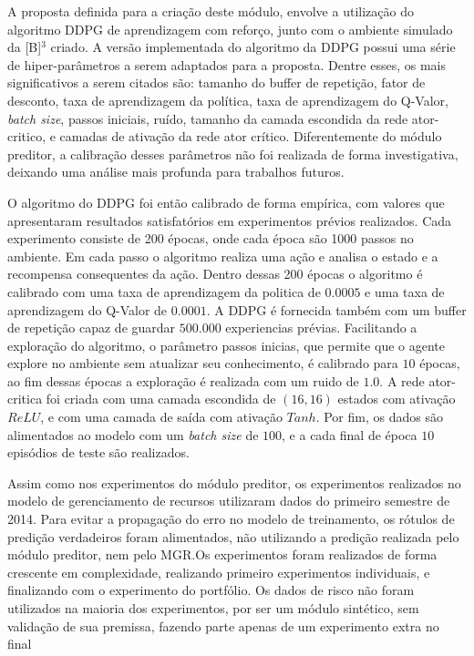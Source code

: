 A proposta definida para a criação deste módulo, envolve a utilização do algoritmo \acrshort{DDPG} de aprendizagem com reforço, junto com o ambiente simulado da [B]$^3$ criado. A versão implementada do algoritmo da \acrshort{DDPG} possui uma série de hiper-parâmetros a serem adaptados para a proposta. Dentre esses, os mais significativos a serem citados são: tamanho do buffer de repetição, fator de desconto, taxa de aprendizagem da política, taxa de aprendizagem do Q-Valor, \emph{batch size}, passos iniciais, ruído, tamanho da camada escondida da rede ator-critico, e camadas de ativação da rede ator crítico. Diferentemente do módulo preditor, a calibração desses parâmetros não foi realizada de forma investigativa, deixando uma análise mais profunda para trabalhos futuros. 

O algoritmo do \acrshort{DDPG} foi então calibrado de forma empírica, com valores que apresentaram resultados satisfatórios em experimentos prévios realizados. Cada experimento consiste de 200 épocas, onde cada época são 1000 passos no ambiente. Em cada passo o algoritmo realiza uma ação e analisa o estado e a recompensa consequentes da ação. Dentro dessas 200 épocas o algoritmo é calibrado com uma taxa de aprendizagem da politica de $0.0005$ e uma taxa de aprendizagem do Q-Valor de $0.0001$. A \acrshort{DDPG} é fornecida também com um buffer de repetição capaz de guardar $500.000$ experiencias prévias. Facilitando a exploração do algoritmo, o parâmetro passos inicias, que permite que o agente explore no ambiente sem atualizar seu conhecimento, é calibrado para $10$ épocas, ao fim dessas épocas a exploração é realizada com um ruido de $1.0$. A rede ator-critica foi criada com uma camada escondida de $(16,16)$ estados com ativação $ReLU$, e com uma camada de saída com ativação $Tanh$. Por fim, os dados são alimentados ao modelo com um \emph{batch size} de $100$, e a cada final de época $10$ episódios de teste são realizados.

Assim como nos experimentos do módulo preditor, os experimentos realizados no modelo de gerenciamento de recursos utilizaram dados do primeiro semestre de 2014. Para evitar a propagação do erro no modelo de treinamento, os rótulos de predição verdadeiros foram alimentados, não utilizando a predição realizada pelo módulo preditor, nem pelo \acrshort{MGR}.Os experimentos foram realizados de forma crescente em complexidade, realizando primeiro experimentos individuais, e finalizando com o experimento do portfólio. Os dados de risco não foram utilizados na maioria dos experimentos, por ser um módulo sintético, sem validação de sua premissa, fazendo parte apenas de um experimento extra no final

